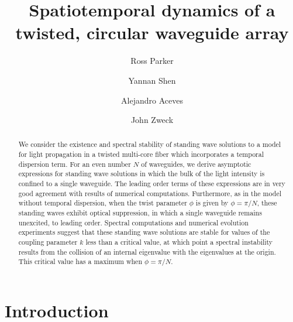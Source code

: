 \documentclass[11pt,reqno]{amsart}
\begin{document}
\title{Spatiotemporal dynamics of a twisted, circular waveguide array}

\author{Ross Parker}
\address{Department of Mathematics, Southern Methodist University, 
Dallas, TX 75275, USA}

\author{Yannan Shen} 
\address{Department of Mathematics, University of Kansas, Lawrence, KS 66045, USA}

\author{Alejandro Aceves}
\address{Department of Mathematics, Southern Methodist University, 
Dallas, TX 75275, USA}

\author{John Zweck}
\address{Department of Mathematics, The University of Texas at Dallas, 
Richardson, TX 75080, USA}

\begin{abstract}
We consider the existence and spectral stability of standing wave solutions to a model for light propagation in a twisted multi-core fiber which incorporates a temporal dispersion term. For an even number $N$ of waveguides, we derive asymptotic expressions for standing wave solutions in which the bulk of the light intensity is confined to a single waveguide. The leading order terms of these expressions are in very good agreement with results of numerical computations. Furthermore, as in the model without temporal dispersion, when the twist parameter $\phi$ is given by $\phi = \pi/N$, these standing waves exhibit optical suppression, in which a single waveguide remains unexcited, to leading order. Spectral computations and numerical evolution experiments suggest that these standing wave solutions are stable for values of the coupling parameter $k$ less than a critical value, at which point a spectral instability results from the collision of an internal eigenvalue with the eigenvalues at the origin. This critical value has a maximum when $\phi = \pi/N$.
\end{abstract}

\maketitle

\section{Introduction}
\end{document}
